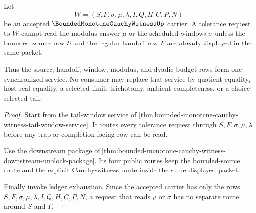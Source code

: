 \begin{theorem}
\label{thm:bounded-monotone-cauchy-witness-source-tail-synchronization}
Let
$$
W=(S,F,\sigma,\mu,\lambda,I,Q,H,C,P,N)
$$
be an accepted $\BoundedMonotoneCauchyWitnessUp$ carrier. A tolerance request to $W$ cannot read the modulus answer $\mu$ or the scheduled windows $\sigma$ unless the bounded source row $S$ and the regular handoff row $F$ are already displayed in the same packet.

Thus the source, handoff, window, modulus, and dyadic-budget rows form one synchronized service. No consumer may replace that service by quotient equality, host real equality, a selected limit, trichotomy, ambient completeness, or a choice-selected tail.
\end{theorem}
\begin{proof}
Start from the tail-window service of \autoref{thm:bounded-monotone-cauchy-witness-tail-window-service}. It routes every tolerance request through $S,F,\sigma,\mu,\lambda$ before any trap or completion-facing row can be read.

Use the downstream package of \autoref{thm:bounded-monotone-cauchy-witness-downstream-unblock-package}. Its four public routes keep the bounded-source route and the explicit Cauchy-witness route inside the same displayed packet.

Finally invoke ledger exhaustion. Since the accepted carrier has only the rows $S,F,\sigma,\mu,\lambda,I,Q,H,C,P,N$, a request that reads $\mu$ or $\sigma$ has no separate route around $S$ and $F$.
\end{proof}

